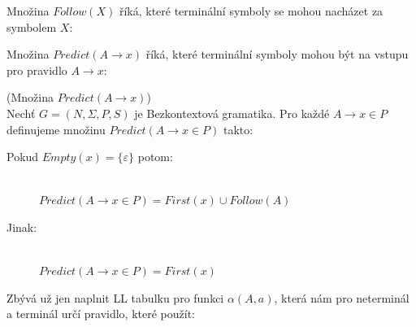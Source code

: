 \noindent
Množina $Follow(X)$ říká, které terminální symboly se mohou nacházet
za symbolem $X$:\\
\begin{algorithm}[H]
  \caption{$Follow(X)$}
  \label{alg:follow}

  \BlankLine
\end{algorithm}
\vspace{0.5cm}

\noindent
Množina $Predict(A \rightarrow x)$ říká, které terminální symboly mohou být
na vstupu pro pravidlo $A \rightarrow x$:
\begin{defn}
  (Množina $Predict(A \rightarrow x)$)\\
  Nechť $G = (N, \Sigma, P, S)$ je Bezkontextová gramatika.
  Pro každé $A \rightarrow x \in P$ definujeme množinu
  $Predict(A \rightarrow x \in P)$ takto:
  \begin{description}
    \item[Pokud $Empty(x) = \{\varepsilon\}$ potom:]\hfill \\
    $Predict(A \rightarrow x \in P) = First(x) \cup Follow(A)$
    \item[Jinak:]\hfill \\
    $Predict(A \rightarrow x \in P) = First(x)$
  \end{description}
\end{defn}
\vspace{0.5cm}

\noindent
Zbývá už jen naplnit LL tabulku pro funkci $\alpha(A, a)$, která nám pro neterminál
a terminál určí pravidlo, které použít:\\
\begin{algorithm}[H]
  \caption{$\alpha(A, a)$}

  \BlankLine
\end{algorithm}
\vspace{0.5cm}

